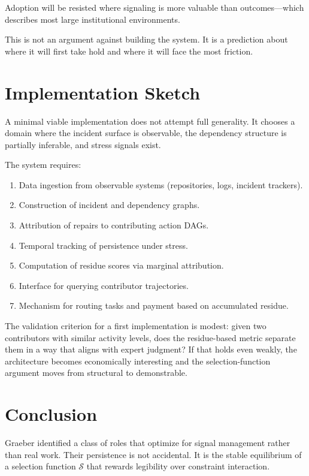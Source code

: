 \documentclass[12pt]{article}
\begin{document}
Adoption will be resisted where signaling is more valuable than
outcomes---which describes most large institutional environments.

This is not an argument against building the system. It is a prediction
about where it will first take hold and where it will face the most
friction.

\section{Implementation Sketch}

A minimal viable implementation does not attempt full generality. It
chooses a domain where the incident surface is observable, the
dependency structure is partially inferable, and stress signals exist.

The system requires:
\begin{enumerate}
  \item Data ingestion from observable systems (repositories, logs,
    incident trackers).
  \item Construction of incident and dependency graphs.
  \item Attribution of repairs to contributing action DAGs.
  \item Temporal tracking of persistence under stress.
  \item Computation of residue scores via marginal attribution.
  \item Interface for querying contributor trajectories.
  \item Mechanism for routing tasks and payment based on accumulated
    residue.
\end{enumerate}

The validation criterion for a first implementation is modest: given
two contributors with similar activity levels, does the residue-based
metric separate them in a way that aligns with expert judgment? If that
holds even weakly, the architecture becomes economically interesting and
the selection-function argument moves from structural to demonstrable.

\section{Conclusion}

Graeber identified a class of roles that optimize for signal management
rather than real work. Their persistence is not accidental. It is the
stable equilibrium of a selection function $\mathcal{S}$ that rewards
legibility over constraint interaction.
\end{document}

